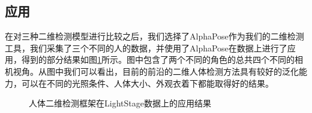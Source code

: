 \subsection{应用}
在对三种二维检测模型进行比较之后，我们选择了AlphaPose作为我们的二维检测工具，我们采集了三个不同的人的数据，并使用了AlphaPose在数据上进行了应用，得到的部分结果如图\ref{fig:ls2d}所示。图中包含了两个不同的角色的总共四个不同的相机视角。从图中我们可以看出，目前的前沿的二维人体检测方法具有较好的泛化能力，可以在不同的光照条件、人体大小、外观衣着下都能取得好的结果。

\begin{figure}[htbp]
    \centering
    \caption{人体二维检测框架在LightStage数据上的应用结果\label{fig:ls2d}}
\end{figure}
